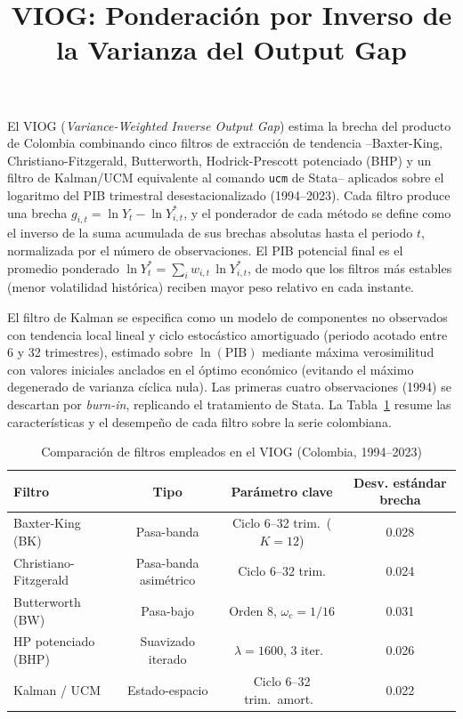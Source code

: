 \documentclass[11pt]{article}
\title{VIOG: Ponderación por Inverso de la Varianza del Output Gap}
\author{}
\date{}
\begin{document}
\maketitle

El VIOG (\emph{Variance-Weighted Inverse Output Gap}) estima la brecha del producto de Colombia
combinando cinco filtros de extracción de tendencia --Baxter-King, Christiano-Fitzgerald,
Butterworth, Hodrick-Prescott potenciado (BHP) y un filtro de Kalman/UCM equivalente al comando
\texttt{ucm} de Stata-- aplicados sobre el logaritmo del PIB trimestral desestacionalizado
(1994--2023). Cada filtro produce una brecha $g_{i,t} = \ln Y_t - \ln Y^{*}_{i,t}$, y el
ponderador de cada método se define como el inverso de la suma acumulada de sus brechas
absolutas hasta el periodo $t$, normalizada por el número de observaciones. El PIB potencial
final es el promedio ponderado $\ln Y^{*}_t = \sum_i w_{i,t}\,\ln Y^{*}_{i,t}$, de modo que los
filtros más estables (menor volatilidad histórica) reciben mayor peso relativo en cada instante.

El filtro de Kalman se especifica como un modelo de componentes no observados con tendencia
local lineal y ciclo estocástico amortiguado (periodo acotado entre 6 y 32 trimestres), estimado
sobre $\ln(\text{PIB})$ mediante máxima verosimilitud con valores iniciales anclados en el
óptimo económico (evitando el máximo degenerado de varianza cíclica nula). Las primeras cuatro
observaciones (1994) se descartan por \emph{burn-in}, replicando el tratamiento de Stata. La
Tabla~\ref{tab:filtros} resume las características y el desempeño de cada filtro sobre la serie
colombiana.

\begin{table}[h]
\centering
\caption{Comparación de filtros empleados en el VIOG (Colombia, 1994--2023)}
\label{tab:filtros}
\begin{tabular}{lccc}
\toprule
\textbf{Filtro} & \textbf{Tipo} & \textbf{Parámetro clave} & \textbf{Desv. estándar brecha} \\
\midrule
Baxter-King (BK)        & Pasa-banda           & Ciclo 6--32 trim.\ ($K=12$) & 0.028 \\
Christiano-Fitzgerald    & Pasa-banda asimétrico & Ciclo 6--32 trim.           & 0.024 \\
Butterworth (BW)         & Pasa-bajo             & Orden 8, $\omega_c=1/16$    & 0.031 \\
HP potenciado (BHP)      & Suavizado iterado     & $\lambda=1600$, 3 iter.\    & 0.026 \\
Kalman / UCM             & Estado-espacio        & Ciclo 6--32 trim.\ amort.\  & 0.022 \\
\bottomrule
\end{tabular}
\end{table}
\end{document}
